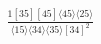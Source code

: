 \documentclass[varwidth, border=5pt]{standalone}
\begin{document}
\begin{my}
$\begin{gathered}
\scriptscriptstyle\frac{1[35][45]⟨45⟩⟨25⟩}{⟨15⟩⟨34⟩⟨35⟩[34]^2}
\end{gathered}$
\end{my}
\end{document}
